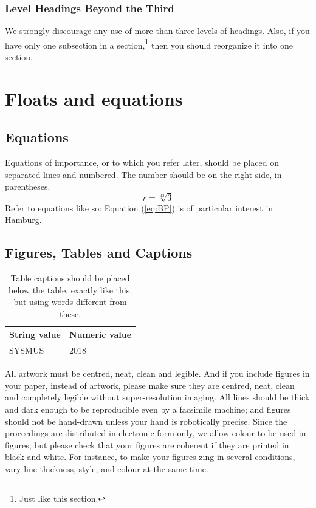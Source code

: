 \documentclass{article}
\begin{document}
\subsubsection{Level Headings Beyond the Third}
We strongly discourage any use of
more than three levels of headings.
Also, if you have only one subsection in a section,\footnote{Just like this section.}
then you should reorganize it into one section.

\section{Floats and equations}

\subsection{Equations}
Equations of importance,
or to which you refer later,
should be placed on separated lines and numbered.
The number should be on the right side, in parentheses.
\begin{equation}
r=\sqrt[13]{3}
\label{eq:BP}
\end{equation}
Refer to equations like so:
Equation (\ref{eq:BP}) is of particular
interest in Hamburg.

\subsection{Figures, Tables and Captions}
\begin{table}[t]
 \begin{center}
 \begin{tabular}{|l|l|}
  \hline
  String value & Numeric value \\
  \hline
   SYSMUS & 2018 \\
  \hline
 \end{tabular}
\end{center}
 \caption{Table captions should be placed below the table, exactly like this,
 but using words different from these.}
 \label{tab:example}
\end{table}

All artwork must be centred, neat, clean and legible.
And if you include figures in your paper, instead of artwork,
please make sure they are centred, neat, clean
and completely legible without super-resolution imaging.
All lines should be thick and dark enough to be reproducible
even by a facsimile machine;
and figures should not be hand-drawn unless your hand is robotically precise.
Since the proceedings are distributed in electronic form only,
we allow colour to be used in figures;
but please check that your figures are
coherent if they are printed in black-and-white.
For instance, to make your figures zing in several conditions,
vary line thickness, style, and colour at the same time.
\end{document}
